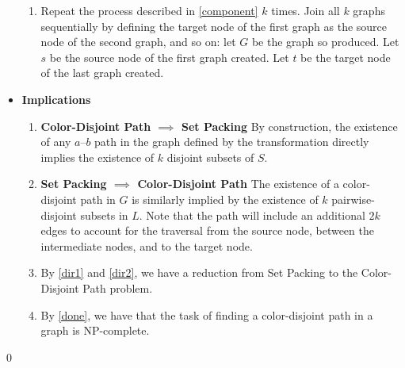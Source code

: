 \documentclass{article}
\begin{document}
\begin{itemize}
\begin{enumerate}
        \item Repeat the process described in \ref{component} $k$
        times. Join all $k$ graphs sequentially by defining the target
        node of the first graph as the source node of the second
        graph, and so on: let $G$ be the graph so produced. Let $s$ be
        the source node of the first graph created. Let $t$ be the
        target node of the last graph created.
        
      \end{enumerate}

    \item \textbf{Implications} 
      \begin{enumerate}
        \item \label{dir1} 
        \textbf{Color-Disjoint Path $\implies$ Set Packing}
        By construction, the existence of any $a$--$b$ path in the
        graph defined by the transformation directly implies the
        existence of $k$ disjoint subsets of $S$.

        \item \label{dir2}
        \textbf{Set Packing $\implies$ Color-Disjoint Path}
        The existence of a color-disjoint path in $G$ is similarly 
        implied by the existence of $k$ pairwise-disjoint subsets in
        $L$. Note that the path will include an additional $2k$ edges
        to account for the traversal from the source node, between
        the intermediate nodes, and to the target node.

        \item \label{done} By \ref{dir1} and \ref{dir2}, we have a reduction
        from Set Packing to the Color-Disjoint Path problem.

        \item By \ref{done}, we have that the task of finding a 
        color-disjoint path in a graph is NP-complete.

      \end{enumerate}

  \end{itemize}
  \qed
    
\end{document}

